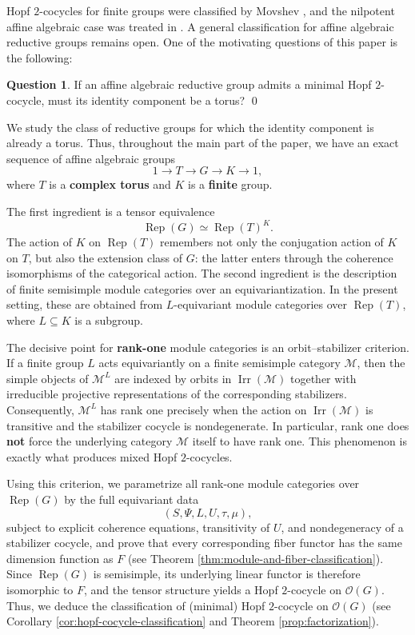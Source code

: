 \documentclass{amsart}
\theoremstyle{definition}
\newtheorem{question}[theorem]{Question}
\newcommand{\Irr}{\operatorname{Irr}}
\newcommand{\Rep}{\operatorname{Rep}}
\newcommand{\M}{\mathscr{M}}
\numberwithin{equation}{section}
\begin{document}
Hopf $2$-cocycles for finite groups were classified by Movshev \cite{Mo}, and the
nilpotent affine algebraic case was treated in \cite{EG1,EG2,G1}.  A general
classification for affine algebraic reductive groups remains open.  One of the
motivating questions of this paper is the following:

\begin{question}\cite[Question 7.2]{EG1}\label{q:torus}
If an affine algebraic reductive group admits a minimal Hopf $2$-cocycle, must its
identity component be a torus? \qed
\end{question}

We study the class of reductive groups for which the identity component is already
a torus.  Thus, throughout the main part of the paper, we have an exact sequence of affine algebraic groups 
\[
 1\longrightarrow T\longrightarrow G\longrightarrow K\longrightarrow 1,
\]
where $T$ is a {\bf complex torus} and $K$ is a {\bf finite} group.

The first ingredient is a tensor equivalence
\[
 \Rep(G)\simeq \Rep(T)^K.
\]
The action of $K$ on $\Rep(T)$ remembers not only the conjugation action of $K$ on
$T$, but also the extension class of $G$: the latter enters through the coherence
isomorphisms of the categorical action.  The second ingredient is the description
of finite semisimple module categories over an equivariantization.  In the present
setting, these are obtained from $L$-equivariant module categories over $\Rep(T)$,
where $L\subseteq K$ is a subgroup.

The decisive point for {\bf rank-one} module categories is an orbit--stabilizer
criterion.  If a finite group $L$ acts equivariantly on a finite semisimple category
$\M$, then the simple objects of $\M^L$ are indexed by orbits in $\Irr(\M)$ together
with irreducible projective representations of the corresponding stabilizers.
Consequently, $\M^L$ has rank one precisely when the action on $\Irr(\M)$ is
transitive and the stabilizer cocycle is nondegenerate.  In particular, rank one
does {\bf not} force the underlying category $\M$ itself to have rank one.
This phenomenon is exactly what produces mixed Hopf $2$-cocycles.

Using this criterion, we parametrize all rank-one module categories over
$\Rep(G)$ by the full equivariant data
\[
 (S,\Psi,L,U,\tau,\mu),
\]
subject to explicit coherence equations, transitivity of $U$, and nondegeneracy of
a stabilizer cocycle, and prove that every corresponding fiber functor has the
same dimension function as $F$ (see Theorem \ref{thm:module-and-fiber-classification}).  Since $\Rep(G)$ is semisimple, its underlying
linear functor is therefore isomorphic to $F$, and the tensor structure yields a
Hopf $2$-cocycle on $\mathscr{O}(G)$. Thus, we deduce the classification of (minimal) Hopf $2$-cocycle on $\mathscr{O}(G)$ (see Corollary \ref{cor:hopf-cocycle-classification} and Theorem \ref{prop:factorization}).
\end{document}
